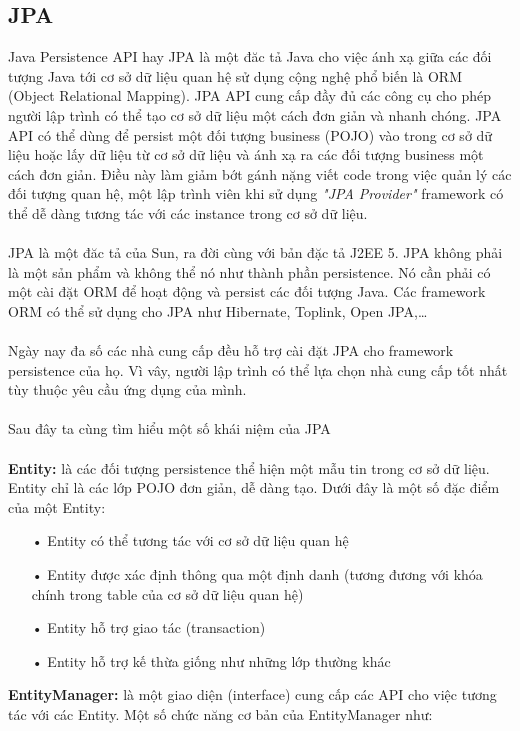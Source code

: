\documentclass[a4paper]{article}
\begin{document}
\subsection{JPA}
Java Persistence API hay JPA là một đăc tả Java cho việc ánh xạ giữa các đối tượng Java tới cơ sở dữ liệu quan hệ sử dụng cộng nghệ phổ biến là ORM (Object Relational Mapping). JPA API cung cấp đầy đủ các công cụ cho phép người lập trình có thể tạo cơ sở dữ liệu một cách đơn giản và nhanh chóng. JPA API có thể dùng để persist một đối tượng business (POJO) vào trong cơ sở dữ liệu hoặc lấy dữ liệu từ cơ sở dữ liệu và ánh xạ ra các đối tượng business một cách đơn giản. Điều này làm giảm bớt gánh nặng viết code trong việc quản lý các đối tượng quan hệ, một lập trình viên khi sử dụng \textit{"JPA Provider"} framework có thể dễ dàng tương tác với các instance trong cơ sở dữ liệu. \\
\\
JPA là một đăc tả của Sun, ra đời cùng với bản đặc tả J2EE 5. JPA không phải là một sản phẩm và không thể nó như thành phần persistence. Nó cần phải có một cài đặt ORM để hoạt động và persist các đối tượng Java. Các framework ORM có thể sử dụng cho JPA như Hibernate, Toplink, Open JPA,…\\
\\
Ngày nay đa số các nhà cung cấp đều hỗ trợ cài đặt JPA cho framework persistence của họ. Vì vây, người lập trình có thể lựa chọn nhà cung cấp tốt nhất tùy thuộc yêu cầu ứng dụng của mình.\\
\\
Sau đây ta cùng tìm hiểu một số khái niệm của JPA \cite{bib12}\\
\\
\textbf{Entity: }là các đối tượng persistence thể hiện một mẫu tin trong cơ sở dữ liệu. Entity chỉ là các lớp POJO đơn giản, dễ dàng tạo. Dưới đây là một số đặc điểm của một Entity: 
\begin{itemize}
	\item[•]Entity có thể tương tác với cơ sở dữ liệu quan hệ
	\item[•]Entity được xác định thông qua một định danh (tương đương với khóa chính trong table của cơ sở dữ liệu quan hệ)
	\item[•]Entity hỗ trợ giao tác (transaction)
	\item[•]Entity hỗ trợ kế thừa giống như những lớp thường khác
\end{itemize}
\textbf{EntityManager: }là một giao diện (interface) cung cấp các API cho việc tương tác với các Entity. Một số chức năng cơ bản của EntityManager như:
\end{document}

